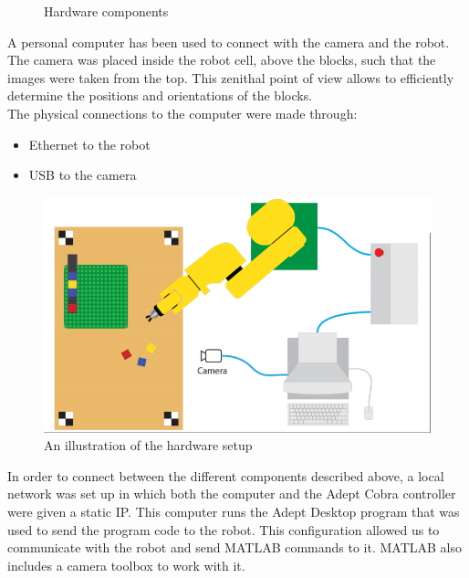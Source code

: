 \begin{figure}[H]
{		\label{fig:cobra}}
	\caption{Hardware components}
\end{figure}

A personal computer has been used to connect with the camera and the robot. The camera was placed inside the robot cell, above the blocks, such that the images were taken from the top. This zenithal point of view allows to efficiently determine the positions and orientations of the blocks. 
\\

The physical connections to the computer were made through: 
\begin{itemize}
	\item Ethernet to the robot  
	\item USB to the camera 
\end{itemize}

\begin{figure}[H]
	\centering
	\includegraphics[scale=0.4]{figures/robotCellDesign.png}
	\caption{An illustration of the hardware setup}
\end{figure}

In order to connect between the different components described above, a local network was set up in which both the computer and the Adept Cobra controller were given a static IP. This computer runs the Adept Desktop program that was used to send the program code to the robot. This configuration allowed us to communicate with the robot and send MATLAB commands to it. MATLAB also includes a camera toolbox to work with it. 
